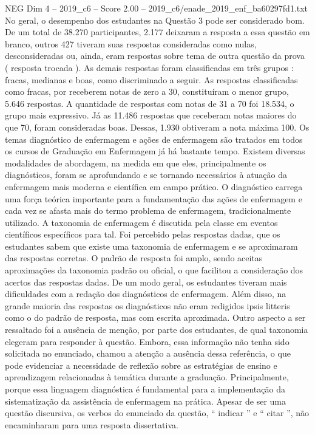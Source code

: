 \begin{textsample}{NEG Dim 4 – 2019\_c6 – Score 2.00 – 2019\_c6/enade\_2019\_enf\_ba60297fd1.txt}
No geral, o desempenho dos estudantes na Questão 3 pode ser considerado bom.
De um total de 38.270 participantes, 2.177 deixaram a resposta a essa questão em branco, outros 427 tiveram suas respostas consideradas como nulas, desconsideradas ou, ainda, eram respostas sobre tema de outra questão da prova ( resposta trocada ).
As demais respostas foram classificadas em três grupos : fracas, medianas e boas, como discriminado a seguir.
As respostas classificadas como fracas, por receberem notas de zero a 30, constituíram o menor grupo, 5.646 respostas.
A quantidade de respostas com notas de 31 a 70 foi 18.534, o grupo mais expressivo.
Já as 11.486 respostas que receberam notas maiores do que 70, foram consideradas boas.
Dessas, 1.930 obtiveram a nota máxima 100.
Os temas diagnóstico de enfermagem e ações de enfermagem são tratados em todos os cursos de Graduação em Enfermagem já há bastante tempo.
Existem diversas modalidades de abordagem, na medida em que eles, principalmente os diagnósticos, foram se aprofundando e se tornando necessários à atuação da enfermagem mais moderna e científica em campo prático.
O diagnóstico carrega uma força teórica importante para a fundamentação das ações de enfermagem e cada vez se afasta mais do termo problema de enfermagem, tradicionalmente utilizado.
A taxonomia de enfermagem é discutida pela classe em eventos científicos específicos para tal.
Foi percebido pelas respostas dadas, que os estudantes sabem que existe uma taxonomia de enfermagem e se aproximaram das respostas corretas.
O padrão de resposta foi amplo, sendo aceitas aproximações da taxonomia padrão ou oficial, o que facilitou a consideração dos acertos das respostas dadas.
De um modo geral, os estudantes tiveram mais dificuldades com a redação dos diagnósticos de enfermagem.
Além disso, na grande maioria das respostas os diagnósticos não eram redigidos ipsis litteris como o do padrão de resposta, mas com escrita aproximada.
Outro aspecto a ser ressaltado foi a ausência de menção, por parte dos estudantes, de qual taxonomia elegeram para responder à questão.
Embora, essa informação não tenha sido solicitada no enunciado, chamou a atenção a ausência dessa referência, o que pode evidenciar a necessidade de reflexão sobre as estratégias de ensino e aprendizagem relacionadas à temática durante a graduação.
Principalmente, porque essa linguagem diagnóstica é fundamental para a implementação da sistematização da assistência de enfermagem na prática.
Apesar de ser uma questão discursiva, os verbos do enunciado da questão, “ indicar ” e “ citar ”, não encaminharam para uma resposta dissertativa.

\end{textsample}
